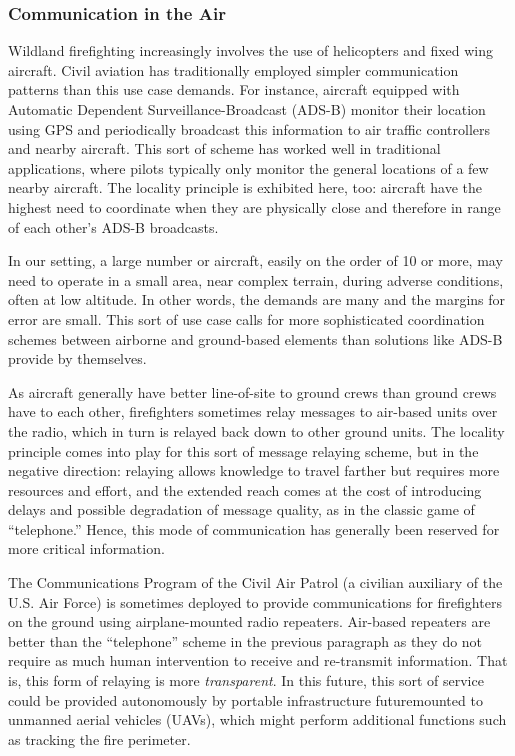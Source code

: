 \documentclass[]             %
{NASA}                       %
\theoremstyle{definition}
\begin{document}
\subsubsection{Communication in the Air}
Wildland firefighting increasingly involves the use of helicopters and
fixed wing aircraft. Civil aviation has traditionally employed simpler
communication patterns than this use case demands. For instance,
aircraft equipped with Automatic Dependent Surveillance-Broadcast
(ADS-B) monitor their location using GPS and periodically broadcast
this information to air traffic controllers and nearby aircraft. This
sort of scheme has worked well in traditional applications, where
pilots typically only monitor the general locations of a few nearby
aircraft. The locality principle is exhibited here, too: aircraft have
the highest need to coordinate when they are physically close and
therefore in range of each other's ADS-B broadcasts.

In our setting, a large number or aircraft, easily on the order of 10 or
more, may need to operate in a small area, near complex terrain,
during adverse conditions, often at low altitude. In other words, the
demands are many and the margins for error are small. This sort of use
case calls for more sophisticated coordination schemes between
airborne and ground-based elements than solutions like ADS-B provide
by themselves.

As aircraft generally have better line-of-site to ground crews than
ground crews have to each other, firefighters sometimes relay messages
to air-based units over the radio, which in turn is relayed back down
to other ground units. The locality principle comes into play for this
sort of message relaying scheme, but in the negative direction:
relaying allows knowledge to travel farther but requires more resources and effort,
and the extended reach comes at the cost of introducing delays and
possible degradation of message quality, as in the classic game of
``telephone.'' Hence, this mode of communication has generally been reserved for
more critical information.

The Communications Program of the Civil Air Patrol (a civilian
auxiliary of the U.S. Air Force) is sometimes deployed to provide
communications for firefighters on the ground using airplane-mounted
radio repeaters. Air-based repeaters are better than the ``telephone''
scheme in the previous paragraph as they do not require as much human
intervention to receive and re-transmit information. That is, this
form of relaying is more \emph{transparent}. In this future, this sort
of service could be provided autonomously by portable infrastructure
futuremounted to unmanned aerial vehicles (UAVs), which might perform
additional functions such as tracking the fire perimeter.
\end{document}
